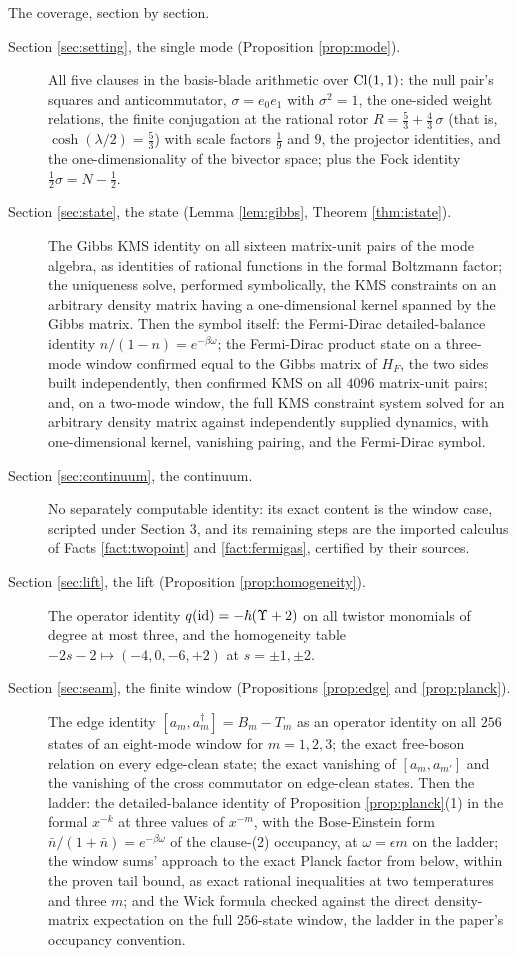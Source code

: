 The coverage, section by section.

\begin{description}
\item[Section \ref{sec:setting}, the single mode (Proposition \ref{prop:mode}).] All five clauses in the basis-blade arithmetic over $\mathrm{Cl}(1,1)$: the null pair's squares and anticommutator, $\sigma = e_0e_1$ with $\sigma^2 = 1$, the one-sided weight relations, the finite conjugation at the rational rotor $R = \tfrac53 + \tfrac43\,\sigma$ (that is, $\cosh(\lambda/2) = \tfrac53$) with scale factors $\tfrac19$ and $9$, the projector identities, and the one-dimensionality of the bivector space; plus the Fock identity $\tfrac12\sigma = N - \tfrac12$.
\item[Section \ref{sec:state}, the state (Lemma \ref{lem:gibbs}, Theorem \ref{thm:istate}).] The Gibbs KMS identity on all sixteen matrix-unit pairs of the mode algebra, as identities of rational functions in the formal Boltzmann factor; the uniqueness solve, performed symbolically, the KMS constraints on an arbitrary density matrix having a one-dimensional kernel spanned by the Gibbs matrix. Then the symbol itself: the Fermi-Dirac detailed-balance identity $n/(1-n) = e^{-\beta\omega}$; the Fermi-Dirac product state on a three-mode window confirmed equal to the Gibbs matrix of $H_F$, the two sides built independently, then confirmed KMS on all $4096$ matrix-unit pairs; and, on a two-mode window, the full KMS constraint system solved for an arbitrary density matrix against independently supplied dynamics, with one-dimensional kernel, vanishing pairing, and the Fermi-Dirac symbol.
\item[Section \ref{sec:continuum}, the continuum.] No separately computable identity: its exact content is the window case, scripted under Section 3, and its remaining steps are the imported calculus of Facts \ref{fact:twopoint} and \ref{fact:fermigas}, certified by their sources.
\item[Section \ref{sec:lift}, the lift (Proposition \ref{prop:homogeneity}).] The operator identity $q(\mathrm{id}) = -\hbar(\Upsilon + 2)$ on all twistor monomials of degree at most three, and the homogeneity table $-2s-2 \mapsto (-4, 0, -6, +2)$ at $s = \pm 1, \pm 2$.
\item[Section \ref{sec:seam}, the finite window (Propositions \ref{prop:edge} and \ref{prop:planck}).] The edge identity $[a_m, a_m^\dagger] = B_m - T_m$ as an operator identity on all $256$ states of an eight-mode window for $m = 1, 2, 3$; the exact free-boson relation on every edge-clean state; the exact vanishing of $[a_m, a_{m'}]$ and the vanishing of the cross commutator on edge-clean states. Then the ladder: the detailed-balance identity of Proposition \ref{prop:planck}(1) in the formal $x^{-k}$ at three values of $x^{-m}$, with the Bose-Einstein form $\bar n/(1 + \bar n) = e^{-\beta\omega}$ of the clause-(2) occupancy, at $\omega = \epsilon m$ on the ladder; the window sums' approach to the exact Planck factor from below, within the proven tail bound, as exact rational inequalities at two temperatures and three $m$; and the Wick formula checked against the direct density-matrix expectation on the full $256$-state window, the ladder in the paper's occupancy convention.

\end{description}
